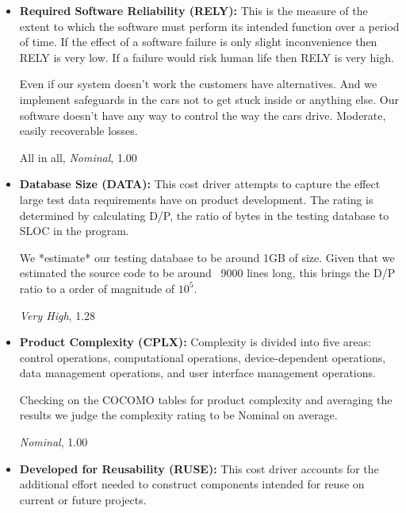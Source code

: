 \documentclass[english]{article}
\begin{document}
\begin{itemize}

\item \textbf{Required Software Reliability (RELY):} This is the measure of the extent to which the software must perform its intended function over a period of time. If the effect of a software failure is only slight inconvenience then RELY is very low. If a failure would risk human life then RELY is very high.

Even if our system doesn't work the customers have alternatives. And we implement safeguards in the cars not to get stuck inside or anything else. Our software doesn't have any way to control the way the cars drive.
Moderate, easily recoverable losses.

All in all, \textit{Nominal}, 1.00

\item \textbf{Database Size (DATA):} This cost driver attempts to capture the effect large test data requirements have on product development. The rating is determined by calculating D/P, the ratio of bytes in the testing database to SLOC in the program.

We *estimate* our testing database to be around 1GB of size. Given that we estimated the source code to be around ~9000 lines long, this brings the D/P ratio to a order of magnitude of $10^5$.

\textit{Very High}, 1.28 


\item \textbf{Product Complexity (CPLX):} Complexity is divided into five areas: control operations, computational operations,
device-dependent operations, data management operations, and user interface management operations.

Checking on the COCOMO tables for product complexity and averaging the results we judge the complexity rating to be Nominal on average.

\textit{Nominal}, 1.00

%

\item \textbf{Developed for Reusability (RUSE):} This cost driver accounts for the additional effort needed to construct components
intended for reuse on current or future projects.


\end{itemize}
\end{document}
